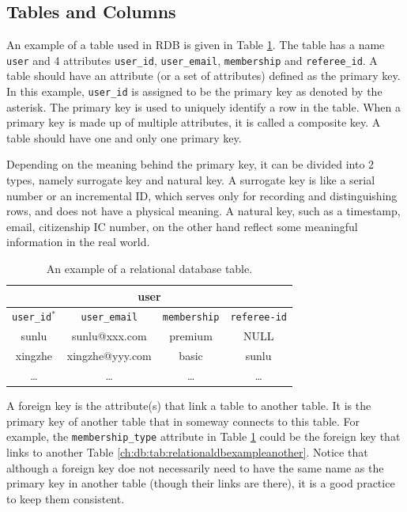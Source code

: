 \subsection{Tables and Columns} \label{ch:db:subsec:tables}

An example of a table used in RDB is given in Table \ref{ch:db:tab:relationaldbexample}. The table has a name \verb|user| and 4 attributes \verb|user_id|, \verb|user_email|, \verb|membership| and \verb|referee_id|. A table should have an attribute (or a set of attributes) defined as the primary key. In this example, \verb|user_id| is assigned to be the primary key as denoted by the asterisk. The primary key is used to uniquely identify a row in the table. When a primary key is made up of multiple attributes, it is called a composite key. A table should have one and only one primary key.

Depending on the meaning behind the primary key, it can be divided into 2 types, namely surrogate key and natural key. A surrogate key is like a serial number or an incremental ID, which serves only for recording and distinguishing rows, and does not have a physical meaning. A natural key, such as a timestamp, email, citizenship IC number, on the other hand reflect some meaningful information in the real world.

\begin{table}
	\centering \caption{An example of a relational database table.} \label{ch:db:tab:relationaldbexample}
	\begin{tabular}{|c|c|c|c|}
		\hline
        \multicolumn{4}{|c|}{user} \\ \hline
		\verb|user_id|$^*$ & \verb|user_email| & \verb|membership| & \verb|referee-id| \\ \hline
        sunlu & sunlu@xxx.com & premium & NULL \\ \hline
        xingzhe & xingzhe@yyy.com & basic & sunlu \\ \hline
        \ldots & \ldots & \ldots & \ldots \\ \hline
	\end{tabular}
\end{table}

A foreign key is the attribute(s) that link a table to another table. It is the primary key of another table that in someway connects to this table. For example, the \verb|membership_type| attribute in Table \ref{ch:db:tab:relationaldbexample} could be the foreign key that links to another Table \ref{ch:db:tab:relationaldbexampleanother}. Notice that although a foreign key doe not necessarily need to have the same name as the primary key in another table (though their links are there), it is a good practice to keep them consistent.

